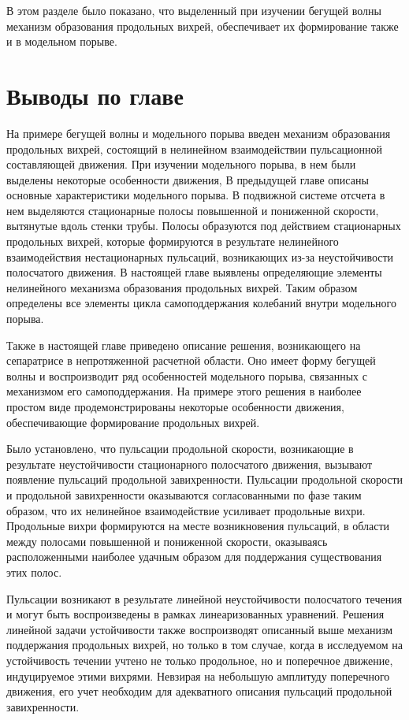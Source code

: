 В этом разделе было показано, что выделенный при изучении бегущей волны механизм образования продольных вихрей, обеспечивает их формирование также и в модельном порыве. 


\section{Выводы по главе}

На примере бегущей волны и модельного порыва введен механизм образования продольных вихрей, состоящий в нелинейном взаимодействии пульсационной составляющей движения. 
При изучении модельного порыва, в нем были выделены некоторые особенности движения, 
В предыдущей главе описаны основные характеристики модельного порыва. В подвижной системе отсчета в нем выделяются стационарные полосы повышенной и пониженной скорости, вытянутые вдоль стенки трубы. Полосы образуются под действием стационарных продольных вихрей, которые формируются в результате нелинейного взаимодействия нестационарных пульсаций, возникающих из-за неустойчивости полосчатого движения. В настоящей главе выявлены определяющие элементы нелинейного механизма образования продольных вихрей. Таким образом определены все элементы цикла самоподдержания колебаний внутри модельного порыва. 

Также в настоящей главе приведено описание решения, возникающего на сепаратрисе в непротяженной расчетной области. Оно имеет форму бегущей волны и воспроизводит ряд особенностей модельного порыва, связанных с механизмом его самоподдержания. На примере этого решения в наиболее простом виде продемонстрированы некоторые особенности движения, обеспечивающие формирование продольных вихрей. 

Было установлено, что пульсации продольной скорости, возникающие в результате неустойчивости стационарного полосчатого движения, вызывают появление пульсаций продольной завихренности. Пульсации продольной скорости и продольной завихренности оказываются согласованными по фазе таким образом, что их нелинейное взаимодействие усиливает продольные вихри. Продольные вихри формируются на месте возникновения пульсаций, в области между полосами повышенной и пониженной скорости, оказываясь расположенными наиболее удачным образом для поддержания существования этих полос.

Пульсации возникают в результате линейной неустойчивости полосчатого течения и могут быть воспроизведены в рамках линеаризованных уравнений. Решения линейной задачи устойчивости также воспроизводят описанный выше механизм поддержания продольных вихрей, но только в том случае, когда в исследуемом на устойчивость течении учтено не только продольное, но и поперечное движение, индуцируемое этими вихрями. Невзирая на небольшую амплитуду поперечного движения, его учет необходим для адекватного описания пульсаций продольной завихренности.

